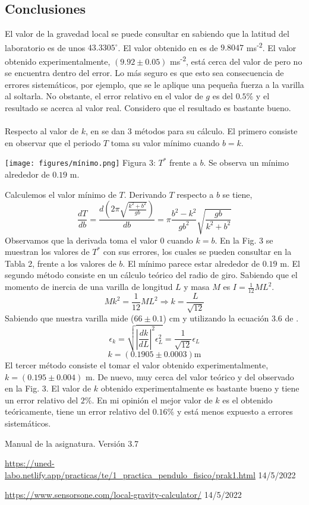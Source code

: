 \documentclass{article}
\begin{document}
\begin{multicols}{2}
\section*{Conclusiones}
El valor de la gravedad local se puede consultar en \cite{gravedad} sabiendo que la latitud del laboratorio es de unos $43.3305^\circ$. El valor obtenido en \cite{gravedad} es de $9.8047$ ms\textsuperscript{-2}. El valor obtenido experimentalmente, $(9.92 \pm 0.05)$ ms\textsuperscript{-2}, está cerca del valor de \cite{gravedad} pero no se encuentra dentro del error. Lo más seguro es que esto sea consecuencia de errores sistemáticos, por ejemplo, que se le aplique una pequeña fuerza a la varilla al soltarla. No obstante, el error relativo en el valor de $g$ es del $0.5\%$ y el resultado se acerca al valor real. Considero que el resultado es bastante bueno.
\\\\
Respecto al valor de $k$, en \cite{web} se dan 3 métodos para su cálculo. El primero consiste en observar que el periodo $T$ toma su valor mínimo cuando $b=k$.
\begin{center}
  \texttt{[image: figures/mínimo.png]}
  Figura 3: $T^*$ frente a $b$. Se observa un mínimo alrededor de $0.19$ m.
\end{center}
Calculemos el valor mínimo de $T$. Derivando $T$ respecto a $b$ se tiene,
$$
\frac{dT}{db} = \frac{d \left( 2\pi \sqrt{\frac{k^2 + b^2}{gb}}\right) }{db} =
\pi \frac{b^2-k^2}{gb^2} \sqrt{\frac{gb}{k^2+b^2}}
$$
Observamos que la derivada toma el valor 0 cuando $k=b$. En la Fig. 3 se muestran los valores de $T^*$ con sus errores, los cuales se pueden consultar en la Tabla 2, frente a los valores de $b$. El mínimo parece estar alrededor de $0.19$ m. El segundo método consiste en un cálculo teórico del radio de giro. Sabiendo que el momento de inercia de una varilla de longitud $L$ y masa $M$ es $I = \frac{1}{12}ML^2$.
$$
Mk^2=\frac{1}{12}ML^2 \Rightarrow k = \frac{L}{\sqrt{12}}
$$
Sabiendo que nuestra varilla mide ($66 \pm 0.1$) cm y utilizando la ecuación 3.6 de \cite{manual}.
$$
\epsilon_k = \sqrt{\left| \frac{dk}{dL} \right|^2 \epsilon_L^2} = \frac{1}{\sqrt{12}} \epsilon_L
$$
$$
k = (0.1905 \pm 0.0003) \text{m}
$$
El tercer método consiste el tomar el valor obtenido experimentalmente, $k = (0.195 \pm 0.004) \text{ m}$. De nuevo, muy cerca del valor teórico y del observado en la Fig. 3. El valor de $k$ obtenido experimentalmente es bastante bueno y tiene un error relativo del $2\%$. En mi opinión el mejor valor de $k$ es el obtenido teóricamente, tiene un error relativo del $0.16\%$ y está menos expuesto a errores sistemáticos. 
\begin{thebibliography}{1}

  Manual de la asignatura. Versión 3.7

  \url{https://uned-labo.netlify.app/practicas/te/1_practica_pendulo_fisico/prak1.html} 14/5/2022
 
  \url{https://www.sensorsone.com/local-gravity-calculator/} 14/5/2022

\end{thebibliography}
\end{multicols}
\end{document}

